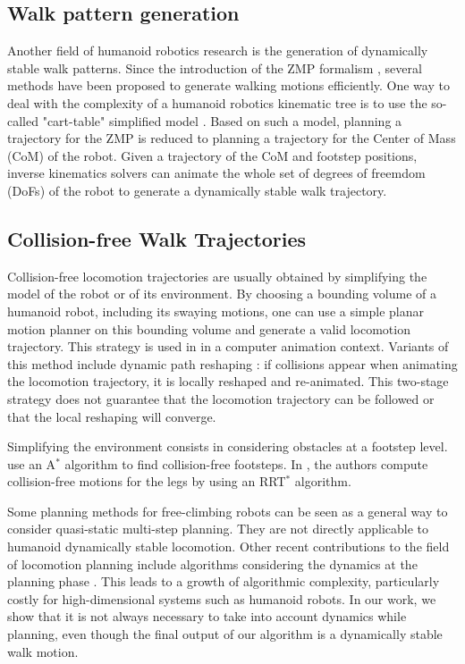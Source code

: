 \documentclass{article}
\begin{document}
\subsection{Walk pattern generation}

Another  field of  humanoid  robotics research  is  the generation  of
dynamically stable  walk patterns. Since  the introduction of  the ZMP
formalism  \cite{vukobratovic1969contribution},  several  methods  have  been  proposed  to
generate  walking  motions efficiently.   One  way  to  deal with  the
complexity  of a  humanoid  robotics  kinematic tree  is  to use  the
so-called "cart-table" simplified model \cite{kajita2003biped}. Based on such a
model,  planning a trajectory  for the  ZMP is  reduced to  planning a
trajectory  for  the Center  of  Mass (CoM)  of  the  robot.  Given  a
trajectory  of  the CoM  and  footstep  positions, inverse  kinematics
solvers can animate  the whole set of degrees of freemdom (DoFs) of the  
robot to generate a dynamically stable walk trajectory.

\subsection{Collision-free Walk Trajectories}

Collision-free  locomotion   trajectories  are  usually   obtained  by
simplifying the model of the  robot or of its environment. By choosing
a bounding volume of a  humanoid robot, including its swaying motions,
one can  use a simple  planar motion planner  on this bounding  volume and
generate  a valid  locomotion  trajectory. This  strategy  is used  in
\cite{pettre20032} in a computer animation context. Variants of this method
include  dynamic path reshaping  \cite{yoshida-humanoids05}: if  collisions appear
when animating  the locomotion  trajectory, it is  locally reshaped
and re-animated.  This two-stage  strategy does not guarantee that the
locomotion trajectory can be followed or that the local reshaping will
converge.

Simplifying  the environment  consists in  considering obstacles  at a
footstep   level.   \cite{chestnutt2005footstep,kuffner2005motion}
use   an  
A$^{*}$   algorithm  to   find
collision-free   footsteps.    In   \cite{perrinbiped},   the   authors   compute
collision-free motions  for the legs by using  an RRT$^{*}$ algorithm. 

Some planning methods for free-climbing robots \cite{bretl2006motion}
can be seen as a general way 
to consider quasi-static multi-step planning. They are not directly applicable to
humanoid dynamically stable locomotion.
Other recent contributions to the field of locomotion planning  include algorithms 
considering the dynamics at the planning phase \cite{shkolnik2011bounding}. This leads to 
a growth of algorithmic complexity, particularly costly for high-dimensional
systems such as humanoid robots. In our work, we show that it is not always
necessary to take into account dynamics while planning, even though the final
output of our algorithm is a dynamically stable walk motion.
\end{document}
